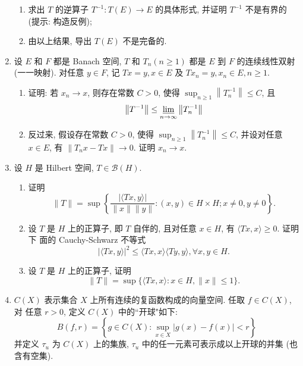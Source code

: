 \begin{enumerate}
\begin{enumerate}
                \item 求出 $T$ 的逆算子 $T^{-1}: T(E) \rightarrow E$ 的具体形式, 并证明 $T^{-1}$ 不是有界的 (提示: 构造反例);
                \item 由以上结果, 导出 $T(E)$ 不是完备的.
            \end{enumerate}
        \item 设 $E$ 和 $F$ 都是 Banach 空间, $T$ 和 $T_{n}(n \geq 1)$ 都是 $E$ 到 $F$ 的连续线性双射 (一一映射). 对任意 $y \in F$, 记 $T x=y, x \in E$ 及 $T x_{n}=y, x_{n} \in E, n \geq 1$.
            \begin{enumerate}
                \item 证明: 若 $x_{n} \rightarrow x$, 则存在常数 $C>0$, 使得 $\sup _{n \geq 1}\left\|T_{n}^{-1}\right\| \leq C$, 且
                \[
                \left\|T^{-1}\right\| \leq \varliminf_{n \rightarrow \infty}\left\|T_{n}^{-1}\right\|
                \]
                \item 反过来, 假设存在常数 $C>0$, 使得 $\sup _{n \geq 1}\left\|T_{n}^{-1}\right\| \leq C$, 并设对任意 $x \in E$, 有 $\left\|T_{n} x-T x\right\| \rightarrow 0$. 证明 $x_{n} \rightarrow x$.
            \end{enumerate}
        \item 设 $H$ 是 Hilbert 空间, $T \in \mathcal{B}(H)$.
            \begin{enumerate}
                \item 证明
                \[
                \|T\|=\sup \left\{\frac{|\langle T x, y\rangle|}{\|x\|\|y\|}:(x, y) \in H \times H ; x \neq  0, y \neq  0\right\}.
                \]
                \item 设 $T$ 是 $H$ 上的正算子, 即 $T$ 自伴的, 且对任意 $x \in H$, 有 $\langle T x, x\rangle \geq 0$. 证明下 面的 Cauchy-Schwarz 不等式
                \[
                |\langle T x, y\rangle|^{2} \leq\langle T x, x\rangle\langle T y, y\rangle, \forall x, y \in H.
                \]
                \item 设 $T$ 是 $H$ 上的正算子, 证明
                \[
                \|T\|=\sup \{\langle T x, x\rangle: x \in H,\|x\| \leq 1\}.
                \]
            \end{enumerate}
        \item $C(X)$ 表示集合 $X$ 上所有连续的复函数构成的向量空间. 任取 $f \in C(X)$, 对 任意 $r>0$, 定义 $C(X)$ 中的“开球"如下:
        \[
        B(f, r)=\left\{g \in C(X): \sup _{x \in X}|g(x)-f(x)|<r\right\}
        \]
        并定义 $\tau_{u}$ 为 $C(X)$ 上的集族, $\tau_{u}$ 中的任一元素可表示成以上开球的并集 (也含有空集).

\end{enumerate}
